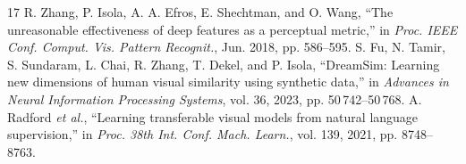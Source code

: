 \begin{thebibliography}{17}
 R. Zhang, P. Isola, A. A. Efros, E. Shechtman, and O. Wang, ``The unreasonable effectiveness of deep features as a perceptual metric,'' in \emph{Proc. IEEE Conf. Comput. Vis. Pattern Recognit.}, Jun. 2018, pp. 586--595.
 S. Fu, N. Tamir, S. Sundaram, L. Chai, R. Zhang, T. Dekel, and P. Isola, ``DreamSim: Learning new dimensions of human visual similarity using synthetic data,'' in \emph{Advances in Neural Information Processing Systems}, vol. 36, 2023, pp. 50\,742--50\,768.
 A. Radford \emph{et al.}, ``Learning transferable visual models from natural language supervision,'' in \emph{Proc. 38th Int. Conf. Mach. Learn.}, vol. 139, 2021, pp. 8748--8763.
\end{thebibliography}
